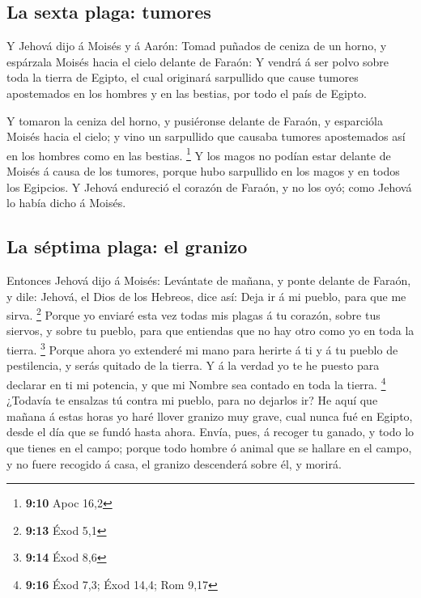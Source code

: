 \hypertarget{la-sexta-plaga-tumores}{%
\subsection{La sexta plaga: tumores}\label{la-sexta-plaga-tumores}}

 Y Jehová dijo á Moisés y á Aarón: Tomad puñados de ceniza
de un horno, y espárzala Moisés hacia el cielo delante de Faraón:
 Y vendrá á ser polvo sobre toda la tierra de Egipto, el
cual originará sarpullido que cause tumores apostemados en los hombres y
en las bestias, por todo el país de Egipto.

 Y tomaron la ceniza del horno, y pusiéronse delante de
Faraón, y esparcióla Moisés hacia el cielo; y vino un sarpullido que
causaba tumores apostemados así en los hombres como en las bestias.
\footnote{\textbf{9:10} Apoc 16,2}  Y los magos no podían
estar delante de Moisés á causa de los tumores, porque hubo sarpullido
en los magos y en todos los Egipcios.  Y Jehová endureció
el corazón de Faraón, y no los oyó; como Jehová lo había dicho á Moisés.

\hypertarget{la-suxe9ptima-plaga-el-granizo}{%
\subsection{La séptima plaga: el
granizo}\label{la-suxe9ptima-plaga-el-granizo}}

 Entonces Jehová dijo á Moisés: Levántate de mañana, y
ponte delante de Faraón, y dile: Jehová, el Dios de los Hebreos, dice
así: Deja ir á mi pueblo, para que me sirva. \footnote{\textbf{9:13}
  Éxod 5,1}  Porque yo enviaré esta vez todas mis plagas á
tu corazón, sobre tus siervos, y sobre tu pueblo, para que entiendas que
no hay otro como yo en toda la tierra. \footnote{\textbf{9:14} Éxod 8,6}
 Porque ahora yo extenderé mi mano para herirte á ti y á tu
pueblo de pestilencia, y serás quitado de la tierra.  Y á
la verdad yo te he puesto para declarar en ti mi potencia, y que mi
Nombre sea contado en toda la tierra. \footnote{\textbf{9:16} Éxod 7,3;
  Éxod 14,4; Rom 9,17}  ¿Todavía te ensalzas tú contra mi
pueblo, para no dejarlos ir?  He aquí que mañana á estas
horas yo haré llover granizo muy grave, cual nunca fué en Egipto, desde
el día que se fundó hasta ahora.  Envía, pues, á recoger tu
ganado, y todo lo que tienes en el campo; porque todo hombre ó animal
que se hallare en el campo, y no fuere recogido á casa, el granizo
descenderá sobre él, y morirá.

